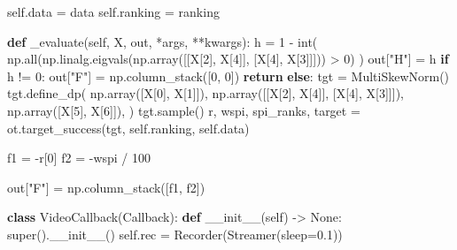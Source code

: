 \documentclass[
  letterpaper,
  DIV=11,
  numbers=noendperiod]{scrartcl}
\newenvironment{Shaded}{\begin{snugshade}}{\end{snugshade}}
\newcommand{\BuiltInTok}[1]{\textcolor[rgb]{0.00,0.23,0.31}{#1}}
\newcommand{\ControlFlowTok}[1]{\textcolor[rgb]{0.00,0.23,0.31}{\textbf{#1}}}
\newcommand{\DecValTok}[1]{\textcolor[rgb]{0.68,0.00,0.00}{#1}}
\newcommand{\FloatTok}[1]{\textcolor[rgb]{0.68,0.00,0.00}{#1}}
\newcommand{\FunctionTok}[1]{\textcolor[rgb]{0.28,0.35,0.67}{#1}}
\newcommand{\KeywordTok}[1]{\textcolor[rgb]{0.00,0.23,0.31}{\textbf{#1}}}
\newcommand{\NormalTok}[1]{\textcolor[rgb]{0.00,0.23,0.31}{#1}}
\newcommand{\OperatorTok}[1]{\textcolor[rgb]{0.37,0.37,0.37}{#1}}
\newcommand{\StringTok}[1]{\textcolor[rgb]{0.13,0.47,0.30}{#1}}
\newcommand{\VariableTok}[1]{\textcolor[rgb]{0.07,0.07,0.07}{#1}}
\begin{document}
\begin{Shaded}
\begin{Highlighting}[]
        \VariableTok{self}\NormalTok{.data }\OperatorTok{=}\NormalTok{ data}
        \VariableTok{self}\NormalTok{.ranking }\OperatorTok{=}\NormalTok{ ranking}

    \KeywordTok{def}\NormalTok{ \_evaluate(}\VariableTok{self}\NormalTok{, X, out, }\OperatorTok{*}\NormalTok{args, }\OperatorTok{**}\NormalTok{kwargs):}
\NormalTok{        h }\OperatorTok{=} \DecValTok{1} \OperatorTok{{-}} \BuiltInTok{int}\NormalTok{(}
\NormalTok{            np.}\BuiltInTok{all}\NormalTok{(np.linalg.eigvals(np.array([[X[}\DecValTok{2}\NormalTok{], X[}\DecValTok{4}\NormalTok{]], [X[}\DecValTok{4}\NormalTok{], X[}\DecValTok{3}\NormalTok{]]])) }\OperatorTok{\textgreater{}} \DecValTok{0}\NormalTok{)}
\NormalTok{        )}
\NormalTok{        out[}\StringTok{"H"}\NormalTok{] }\OperatorTok{=}\NormalTok{ h}
        \ControlFlowTok{if}\NormalTok{ h }\OperatorTok{!=} \DecValTok{0}\NormalTok{:}
\NormalTok{            out[}\StringTok{"F"}\NormalTok{] }\OperatorTok{=}\NormalTok{ np.column\_stack([}\DecValTok{0}\NormalTok{, }\DecValTok{0}\NormalTok{])}
            \ControlFlowTok{return}
        \ControlFlowTok{else}\NormalTok{:}
\NormalTok{            tgt }\OperatorTok{=}\NormalTok{ MultiSkewNorm()}
\NormalTok{            tgt.define\_dp(}
\NormalTok{                np.array([X[}\DecValTok{0}\NormalTok{], X[}\DecValTok{1}\NormalTok{]]),}
\NormalTok{                np.array([[X[}\DecValTok{2}\NormalTok{], X[}\DecValTok{4}\NormalTok{]], [X[}\DecValTok{4}\NormalTok{], X[}\DecValTok{3}\NormalTok{]]]),}
\NormalTok{                np.array([X[}\DecValTok{5}\NormalTok{], X[}\DecValTok{6}\NormalTok{]]),}
\NormalTok{            )}
\NormalTok{            tgt.sample()}
\NormalTok{            r, wspi, spi\_ranks, target }\OperatorTok{=}\NormalTok{ ot.target\_success(tgt, }\VariableTok{self}\NormalTok{.ranking, }\VariableTok{self}\NormalTok{.data)}

\NormalTok{            f1 }\OperatorTok{=} \OperatorTok{{-}}\NormalTok{r[}\DecValTok{0}\NormalTok{]}
\NormalTok{            f2 }\OperatorTok{=} \OperatorTok{{-}}\NormalTok{wspi }\OperatorTok{/} \DecValTok{100}

\NormalTok{            out[}\StringTok{"F"}\NormalTok{] }\OperatorTok{=}\NormalTok{ np.column\_stack([f1, f2])}


\KeywordTok{class}\NormalTok{ VideoCallback(Callback):}
    \KeywordTok{def} \FunctionTok{\_\_init\_\_}\NormalTok{(}\VariableTok{self}\NormalTok{) }\OperatorTok{{-}\textgreater{}} \VariableTok{None}\NormalTok{:}
        \BuiltInTok{super}\NormalTok{().}\FunctionTok{\_\_init\_\_}\NormalTok{()}
        \VariableTok{self}\NormalTok{.rec }\OperatorTok{=}\NormalTok{ Recorder(Streamer(sleep}\OperatorTok{=}\FloatTok{0.1}\NormalTok{))}


\end{Highlighting}
\end{Shaded}
\end{document}
